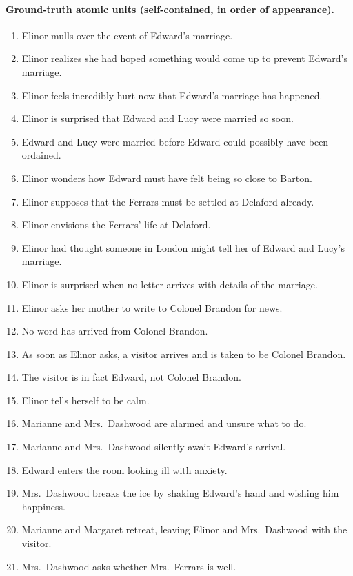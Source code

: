 \documentclass[11pt]{article}
\begin{document}
\paragraph{Ground-truth atomic units (self-contained, in order of appearance).}
\begin{enumerate}[label=\textbf{G\arabic*.},leftmargin=*]
  \item Elinor mulls over the event of Edward's marriage.
  \item Elinor realizes she had hoped something would come up to prevent Edward's marriage.
  \item Elinor feels incredibly hurt now that Edward's marriage has happened.
  \item Elinor is surprised that Edward and Lucy were married so soon.
  \item Edward and Lucy were married before Edward could possibly have been ordained.
  \item Elinor wonders how Edward must have felt being so close to Barton.
  \item Elinor supposes that the Ferrars must be settled at Delaford already.
  \item Elinor envisions the Ferrars' life at Delaford.
  \item Elinor had thought someone in London might tell her of Edward and Lucy's marriage.
  \item Elinor is surprised when no letter arrives with details of the marriage.
  \item Elinor asks her mother to write to Colonel Brandon for news.
  \item No word has arrived from Colonel Brandon.
  \item As soon as Elinor asks, a visitor arrives and is taken to be Colonel Brandon.
  \item The visitor is in fact Edward, not Colonel Brandon.
  \item Elinor tells herself to be calm.
  \item Marianne and Mrs.~Dashwood are alarmed and unsure what to do.
  \item Marianne and Mrs.~Dashwood silently await Edward's arrival.
  \item Edward enters the room looking ill with anxiety.
  \item Mrs.~Dashwood breaks the ice by shaking Edward's hand and wishing him happiness.
  \item Marianne and Margaret retreat, leaving Elinor and Mrs.~Dashwood with the visitor.
  \item Mrs.~Dashwood asks whether Mrs.~Ferrars is well.

\end{enumerate}
\end{document}
